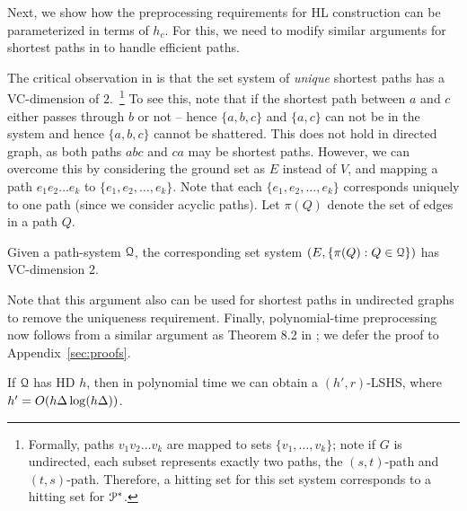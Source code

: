 Next, we show how the preprocessing requirements for HL construction can be parameterized in terms of $h_c$. For this, we need to modify similar arguments for shortest paths in \cite{highway2013} to handle efficient paths.

The critical observation in \cite{highway2013} is that the set system of \emph{unique} shortest paths has a VC-dimension of $2$.~\footnote{
Formally, paths $v_1v_2\ldots v_k$ are mapped to sets $\{v_1,\ldots,v_k\}$; note if $G$ is undirected, each subset represents exactly two paths, the $(s,t)$-path and $(t,s)$-path. Therefore, a hitting set for this set system corresponds to a hitting set for $\mathcal{P}^*$.}
To see this, note that if the shortest path between $a$ and $c$ either passes through $b$ or not -- hence $\{a,b,c\}$ and $\{a,c\}$ can not be in the system and hence $\{a,b,c\}$ cannot be shattered.
This does not hold in directed graph, as both paths $abc$ and $ca$ may be shortest paths. However, we can overcome this by considering the ground set as $E$ instead of $V$, and mapping a path $e_1e_2\ldots e_k$ to $\{e_1,e_2,\ldots,e_k\}$.
Note that each $\{e_1,e_2,\ldots,e_k\}$ corresponds uniquely to one path (since we consider acyclic paths).
Let $\pi(Q)$ denote the set of edges in a path $Q$.
\begin{proposition}
Given a path-system $\mathcal{Q}$, the corresponding set system $(E,\{\pi(Q):Q\in\mathcal{Q}\})$ has VC-dimension 2.
\end{proposition}
Note that this argument also can be used for shortest paths in undirected graphs to remove the uniqueness requirement.
Finally, polynomial-time preprocessing now follows from a similar argument as Theorem 8.2 in \cite{highway2013}; we defer the proof to Appendix~\ref{sec:proofs}.

\begin{proposition}\label{prop:poly_lshs}
If $\mathcal{Q}$ has HD $h$, then in polynomial time we can obtain a $(h',r)$-LSHS, where $h'=O(h\Delta\log(h\Delta))$.	
\end{proposition}
